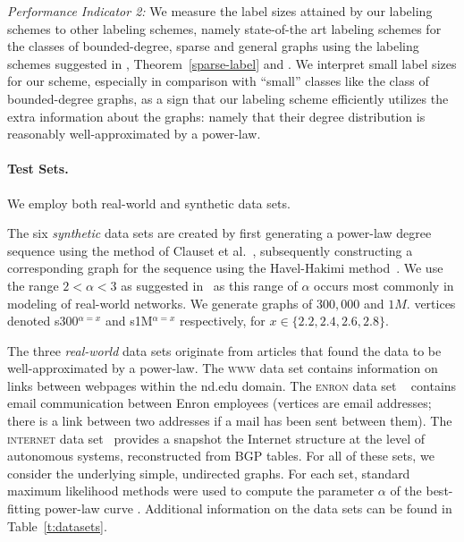 \documentclass{article}
\theoremstyle{remark}
\begin{document}
\emph{Performance Indicator 2:} We  measure the label sizes attained by our labeling schemes to other labeling schemes, namely state-of-the art labeling schemes for the classes of bounded-degree, sparse and general graphs using the  labeling schemes suggested in \cite{adjiashvili2014labeling},  Theorem~\ref{sparse-label} and \cite{alstrup2014adjacency}. We interpret small label sizes for our scheme, especially in comparison with ``small'' classes like the class of bounded-degree graphs, as a sign that our labeling scheme efficiently utilizes the extra information about the graphs: namely that their degree distribution is reasonably well-approximated by a power-law.
 

\paragraph{Test Sets.}
We employ both real-world and synthetic data sets. 

The six \emph{synthetic} data sets are created by first generating a power-law degree sequence using the method of Clauset et al.~\cite[App.\ D]{clauset2009power}, subsequently constructing a corresponding graph for the sequence using the Havel-Hakimi method~\cite{hakimi1962realizability}. 
We use the range $2< \alpha < 3$ as suggested in~\cite{clauset2009power} as this range of $\alpha$ occurs most commonly in modeling of real-world networks. We generate graphs of $300,000$ and $1M.$ vertices denoted  s300$^{\alpha=x}$  and s1M$^{\alpha=x}$  respectively, for $x \in \{2.2,2.4,2.6,2.8\}$. 


The three \emph{real-world} data sets originate  from articles that found the data to be well-approximated by a power-law. 
The \textsc{www} data set  \cite{albert1999internet} contains information on links between webpages within the nd.edu domain. 
The \textsc{enron} data set ~\cite{leskovec2009community}  contains email communication between  Enron employees (vertices are email addresses; there is a link between two addresses
if a mail has been sent between them).
The \textsc{internet} data set~\cite{newman} provides a snapshot the Internet structure at the level of  autonomous systems, reconstructed from BGP tables. 
For all of these sets, we consider the underlying simple, undirected graphs. For each set, standard maximum likelihood methods were used to compute the parameter
$\alpha$ of the best-fitting power-law curve \cite{clauset2009power}. Additional information on the data sets can be found in Table~\ref{t:datasets}.
\end{document}
